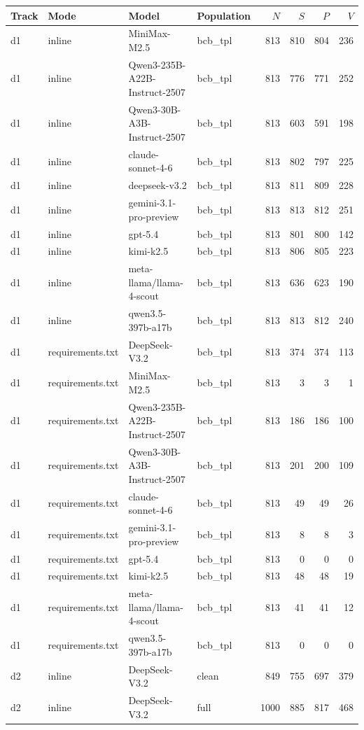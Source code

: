 \begin{tabular}{llllrrrr}
\toprule
Track & Mode & Model & Population & $N$ & $S$ & $P$ & $V$ \\
\midrule
d1 & inline & MiniMax-M2.5 & bcb\_tpl & 813 & 810 & 804 & 236 \\
d1 & inline & Qwen3-235B-A22B-Instruct-2507 & bcb\_tpl & 813 & 776 & 771 & 252 \\
d1 & inline & Qwen3-30B-A3B-Instruct-2507 & bcb\_tpl & 813 & 603 & 591 & 198 \\
d1 & inline & claude-sonnet-4-6 & bcb\_tpl & 813 & 802 & 797 & 225 \\
d1 & inline & deepseek-v3.2 & bcb\_tpl & 813 & 811 & 809 & 228 \\
d1 & inline & gemini-3.1-pro-preview & bcb\_tpl & 813 & 813 & 812 & 251 \\
d1 & inline & gpt-5.4 & bcb\_tpl & 813 & 801 & 800 & 142 \\
d1 & inline & kimi-k2.5 & bcb\_tpl & 813 & 806 & 805 & 223 \\
d1 & inline & meta-llama/llama-4-scout & bcb\_tpl & 813 & 636 & 623 & 190 \\
d1 & inline & qwen3.5-397b-a17b & bcb\_tpl & 813 & 813 & 812 & 240 \\
d1 & requirements.txt & DeepSeek-V3.2 & bcb\_tpl & 813 & 374 & 374 & 113 \\
d1 & requirements.txt & MiniMax-M2.5 & bcb\_tpl & 813 & 3 & 3 & 1 \\
d1 & requirements.txt & Qwen3-235B-A22B-Instruct-2507 & bcb\_tpl & 813 & 186 & 186 & 100 \\
d1 & requirements.txt & Qwen3-30B-A3B-Instruct-2507 & bcb\_tpl & 813 & 201 & 200 & 109 \\
d1 & requirements.txt & claude-sonnet-4-6 & bcb\_tpl & 813 & 49 & 49 & 26 \\
d1 & requirements.txt & gemini-3.1-pro-preview & bcb\_tpl & 813 & 8 & 8 & 3 \\
d1 & requirements.txt & gpt-5.4 & bcb\_tpl & 813 & 0 & 0 & 0 \\
d1 & requirements.txt & kimi-k2.5 & bcb\_tpl & 813 & 48 & 48 & 19 \\
d1 & requirements.txt & meta-llama/llama-4-scout & bcb\_tpl & 813 & 41 & 41 & 12 \\
d1 & requirements.txt & qwen3.5-397b-a17b & bcb\_tpl & 813 & 0 & 0 & 0 \\
d2 & inline & DeepSeek-V3.2 & clean & 849 & 755 & 697 & 379 \\
d2 & inline & DeepSeek-V3.2 & full & 1000 & 885 & 817 & 468 \\

\end{tabular}
